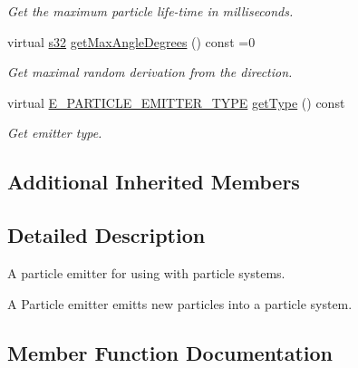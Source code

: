 \begin{DoxyCompactItemize}
\begin{DoxyCompactList}\small\item\em Get the maximum particle life-\/time in milliseconds. \end{DoxyCompactList}\item 
\mbox{\label{classirr_1_1scene_1_1IParticleEmitter_acce76d94b340feea5b35416e0a9705ae}} 
virtual \hyperlink{namespaceirr_ac66849b7a6ed16e30ebede579f9b47c6}{s32} \hyperlink{classirr_1_1scene_1_1IParticleEmitter_acce76d94b340feea5b35416e0a9705ae}{get\+Max\+Angle\+Degrees} () const =0
\begin{DoxyCompactList}\small\item\em Get maximal random derivation from the direction. \end{DoxyCompactList}\item 
\mbox{\label{classirr_1_1scene_1_1IParticleEmitter_a3eca8b0f8914803778cbfdf2731f3245}} 
virtual \hyperlink{namespaceirr_1_1scene_a3e251a881c886884a78adea2e546272b}{E\+\_\+\+P\+A\+R\+T\+I\+C\+L\+E\+\_\+\+E\+M\+I\+T\+T\+E\+R\+\_\+\+T\+Y\+PE} \hyperlink{classirr_1_1scene_1_1IParticleEmitter_a3eca8b0f8914803778cbfdf2731f3245}{get\+Type} () const
\begin{DoxyCompactList}\small\item\em Get emitter type. \end{DoxyCompactList}\end{DoxyCompactItemize}
\subsection*{Additional Inherited Members}


\subsection{Detailed Description}
A particle emitter for using with particle systems. 

A Particle emitter emitts new particles into a particle system. 

\subsection{Member Function Documentation}
\mbox{\label{classirr_1_1scene_1_1IParticleEmitter_aaf773f8ce5db3b5a2455561ef7818506}} 
